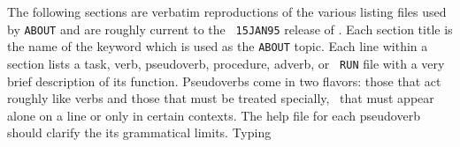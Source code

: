      The following sections are verbatim reproductions of the various
listing files used by {\tt ABOUT} and are roughly current to the {\tt
15JAN95} release of \hbox{\AIPS}.  Each section title is the name of
the keyword which is used as the {\tt ABOUT} topic.  Each line within
a section lists a task, verb, pseudoverb, procedure, adverb, or {\tt
RUN} file with a very brief description of its function.  Pseudoverbs
come in two flavors: those that act roughly like verbs and those that
must be treated specially, \ie\ that must appear alone on a line or
only in certain contexts.  The help file for each pseudoverb should
clarify the its grammatical limits.  Typing

\small
{}

